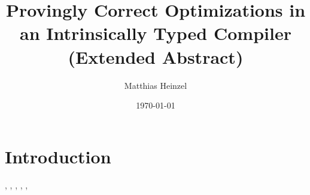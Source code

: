 \documentclass[sigplan,screen,authordraft]{acmart}
\title{Provingly Correct Optimizations in an Intrinsically Typed Compiler (Extended Abstract)}
\author{Matthias Heinzel}
\affiliation{%
  \institution{Utrecht University}
  \city{Utrecht}
  \country{Netherlands}}
\date{\today}
\begin{document}
\maketitle

\section{Introduction}

\cite{norell2007agda},
\cite{augustsson1999intrinsic},
\cite{nielsen1999analysis},
\cite{chapman2009type},
\cite{bove2016recursion},


{}
\end{document}
